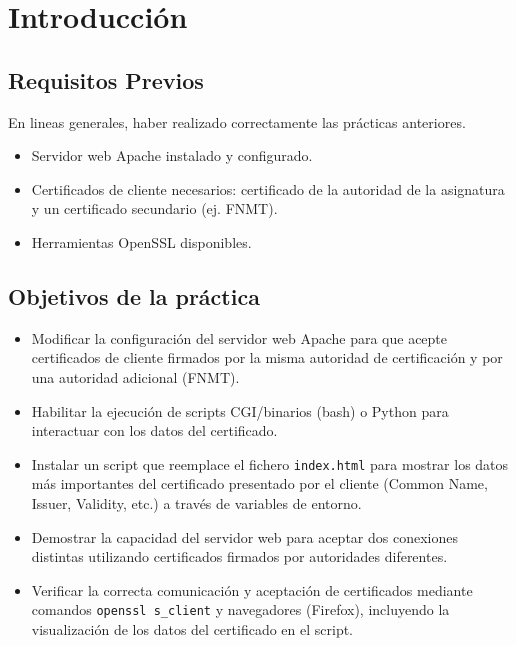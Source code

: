 \chapter{Introducción}

\section{Requisitos Previos}
En lineas generales, haber realizado correctamente las prácticas anteriores.
\begin{itemize}
    \item Servidor web Apache instalado y configurado.
    \item Certificados de cliente necesarios: certificado de la autoridad de la asignatura y un certificado secundario (ej. FNMT).
    \item Herramientas OpenSSL disponibles.
\end{itemize}

\section{Objetivos de la práctica}
\begin{itemize}
    \item Modificar la configuración del servidor web Apache para que acepte certificados de cliente firmados por la misma autoridad de certificación y por una autoridad adicional (FNMT).
    \item Habilitar la ejecución de scripts CGI/binarios (bash) o Python para interactuar con los datos del certificado.
    \item Instalar un script que reemplace el fichero \texttt{index.html} para mostrar los datos más importantes del certificado presentado por el cliente (Common Name, Issuer, Validity, etc.) a través de variables de entorno.
    \item Demostrar la capacidad del servidor web para aceptar dos conexiones distintas utilizando certificados firmados por autoridades diferentes.
    \item Verificar la correcta comunicación y aceptación de certificados mediante comandos \texttt{openssl s\_client} y navegadores (Firefox), incluyendo la visualización de los datos del certificado en el script.
\end{itemize}

